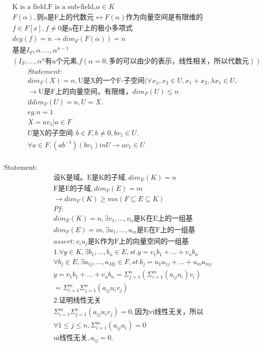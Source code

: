 \documentclass[12pt, a4paper]{article}  %
\begin{document}
\begin{align}
    &\text{K is a field,F is a sub-field,}\alpha \in K\\
    &F(\alpha),\text{则a是F上的代数元}\leftrightarrow F(\alpha)\text{作为向量空间是有限维的}\\
    &f\in F[x],f\neq 0\text{是a在F上的极小多项式}\\
    &deg(f)=n\rightarrow dim_F(F(\alpha))=n\\
    &\text{基是}I_F,\alpha,...,\alpha^{n-1}\\
    &(I_F,...,\alpha^n\text{有n个元素,}f(\alpha =0,\text{多的可以由少的表示，线性相关，所以代数元}))
\end{align}
\begin{align}
    &Statement:\\
    &dim_F(X)=n,\text{U是X的一个F-子空间}(\forall x_1,x_2\in U,x_1+x_2,\lambda x_1\in U,\\
    &\rightarrow \text{U是F上的向量空间，有限维，}dim_F(U)\leqslant n\\
    &\text{if}dim_F(U)=n,U=X.\\
    &eg.n=1\\
    &X={av_1|a\in F}\\
    &U\text{是X的子空间}:b\in F,b\neq 0,bv_1\in U.\\
    &\forall a\in F,(ab^{-1})(bv_1)in U\rightarrow av_1\in U\\
\end{align}

Statement:
\begin{align}
    &\text{设K是域。E是K的子域},dim_E(K)=n\\
    &\text{F是E的子域},dim_F(E)=m\\
    &\rightarrow dim_F(K)\geqslant mn(F\subseteq E\subseteq K)\\
    &Pf:\\
    &dim_E(K)=n,\exists v_1,...,v_n\text{是K在E上的一组基}\\
    &dim_F(E)=m,\exists u_1,...,u_m\text{是E在F上的一组基}\\
    &assert:v_iu_j\text{是K作为F上的向量空间的一组基}\\
    &1.\forall y\in K,\exists b_1,...,b_n\in E,st.y=v_1b_1+...+v_nb_n\\
    &\forall b_j\in E,\exists a_{1j},...,a_{Mj}\in F,st.b_j=u_1a_{1j}+...+u_ma_{mj}\\
    &y=v_1b_1+...+v_nb_n=\Sigma_{j=1}^{n}(\Sigma_{i=1}^{m}(a_{ij}u_i)v_i)\\
    &=\Sigma_{i=1}^{m}\Sigma_{j=1}^{n}(a_{ij}u_iv_j)\\
    &2.\text{证明线性无关}\\
    &\Sigma_{i=1}^{m}\Sigma_{j=1}^{n}(a_{ij}u_iv_j)=0,\text{因为vi线性无关，所以}\\
    &\forall 1\leqslant j\leqslant n,\Sigma_{i=1}^m(a_{ij}u_i)=0\\
    &\text{ui线性无关},a_{ij}=0.
\end{align}
    
\end{document}
